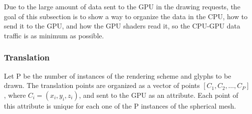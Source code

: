 \documentclass[twoside,twocolumn,10pt]{article}
\begin{document}

Due to the large amount of data sent to the GPU in the drawing requests, the goal of this subsection is to show a way to organize the data in the CPU, how to send it to the GPU, and how the GPU shaders read it, so the CPU-GPU data traffic is as minimum as possible. %






\subsubsection{Translation}
Let P be the number of instances of the rendering scheme and glyphs to be drawn. The translation points are organized as a vector of points $[C_1,C_2, \dots, C_P]$, where $C_i = (x_i, y_i, z_i)$, and sent to the GPU as an attribute. Each point of this attribute is unique for each one of the P instances of the spherical mesh.
\end{document}
